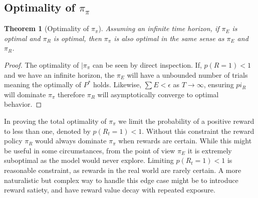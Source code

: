 \documentclass[10pt,letterpaper]{article}
\newtheorem{theorem}{Theorem}
\begin{document}
\subsection*{Optimality of $\pi_{\pi}$} \label{sec:opt_pipi}
\begin{theorem}[Optimality of $\pi_{\pi}$] \label{theorem:meta}
    Assuming an infinite time horizon, if $\pi_E$ is optimal and $\pi_R$ is optimal, then $\pi_{\pi}$ is also optimal in the same sense as $\pi_E$ and $\pi_R$.
\end{theorem}
\begin{proof}
    The optimality of $|\pi_{\pi}$ can be seen by direct inspection. If, $p(R = 1) < 1$ and we have an infinite horizon, the $\pi_E$ will have a unbounded number of trials meaning the optimally of $P^*$ holds. Likewise, $\sum E < \epsilon$ as $T \rightarrow \infty$, ensuring $pi_R$ will dominate $\pi_{\pi}$ therefore $\pi_R$ will asymptotically converge to optimal behavior.
\end{proof}

In proving the total optimality of $\pi_{\pi}$ we limit the probability of a positive reward to less than one, denoted by $p(R_t = 1) < 1$. Without this constraint the reward policy $\pi_R$ would always dominate $\pi_{\pi}$ when rewards are certain. While this might be useful in some circumstances, from the point of view $\pi_E$ it is extremely suboptimal as the model would never explore. Limiting $p(R_t = 1) < 1$ is reasonable constraint, as rewards in the real world are rarely certain. A more naturalistic but complex way to handle this edge case might be to introduce reward satiety, and have reward value decay with repeated exposure. 
\end{document}
